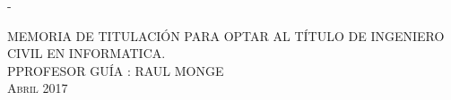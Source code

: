 \begin{titlingpage}
\begin{SingleSpace}
\begin{adjustwidth*}{\unitlength}{-\unitlength}
\begin{center}
\vspace{11mm}
{\Large MEMORIA DE TITULACIÓN PARA OPTAR AL TÍTULO DE \textsc{INGENIERO CIVIL EN INFORMATICA}. }\\

\vspace{9mm}
{\Large PPROFESOR GUÍA : RAUL MONGE}\\
\vspace{9mm}
{\large\textsc{Abril 2017}}
\vspace{12mm}
\end{center}

\end{adjustwidth*}
\end{SingleSpace}
\end{titlingpage}